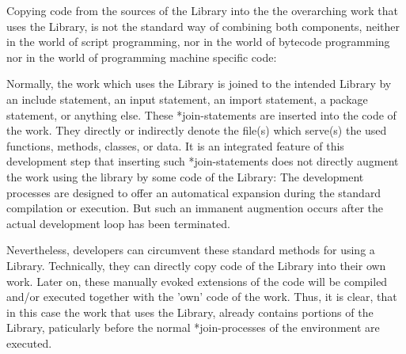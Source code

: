 Copying code from the sources of the Library into the the overarching work that
uses the Library, is not the standard way of combining both components, neither
in the world of script programming, nor in the world of bytecode programming
nor in the world of programming machine specific code:

Normally, the work which uses the Library is joined to the intended Library by
an include statement, an input statement, an import statement, a package
statement, or anything else. These *join-statements are inserted into the code
of the work. They directly or indirectly denote the file(s) which serve(s) the
used functions, methods, classes, or data. It is an integrated feature of this
development step that inserting such *join-statements does not directly augment
the work using the library by some code of the Library: The development
processes are designed to offer an automatical expansion during the standard
compilation or execution. But such an immanent augmention occurs after the
actual development loop has been terminated.

Nevertheless, developers can circumvent these standard methods for using a
Library. Technically, they can directly copy code of the Library into their own
work. Later on, these manually evoked extensions of the code will be compiled
and/or executed together with the 'own' code of the work. Thus, it is clear,
that in this case the work that uses the Library, already contains portions of
the Library, paticularly before the normal *join-processes of the environment
are executed.

